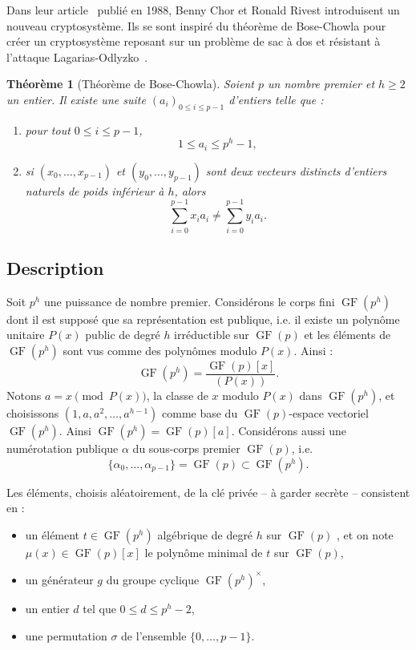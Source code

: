 \documentclass[a4paper, titlepage, 11pt]{article}
\newtheorem{theo}{Théorème}[section]
\theoremstyle{definition}
\theoremstyle{remark}
\def\gf{\operatorname{GF}}
\begin{document}
Dans leur article~\cite{chorRivest1988} publié en 1988, Benny Chor et Ronald Rivest introduisent un nouveau cryptosystème. Ils se sont inspiré du théorème de Bose-Chowla pour créer un cryptosystème reposant sur un problème de sac à dos et résistant à l'attaque Lagarias-Odlyzko~\cite{lagarias1983}.
\begin{theo}[Théorème de Bose-Chowla]
Soient $p$ un nombre premier et $h \geqslant 2$ un entier. Il existe une suite ${(a_i)}_{0\leqslant i \leqslant p-1}$ d'entiers telle que : \begin{enumerate}
\item pour tout $0 \leqslant i \leqslant p-1$, $$1 \leqslant a_i \leqslant p^h-1,$$
\item si $(x_0, \dots, x_{p-1})$ et $(y_0, \dots, y_{p-1})$ sont deux vecteurs distincts d'entiers naturels de poids inférieur à $h$, alors 
$$\sum_{i=0}^{p-1} x_ia_i \neq \sum_{i=0}^{p-1} y_ia_i.$$
\end{enumerate}
\end{theo}

\subsection{Description}

Soit $p^h$ une puissance de nombre premier. Considérons le corps fini $\gf(p^h)$ dont il est supposé que sa représentation est publique, i.e. il existe un polynôme unitaire $P(x)$ public de degré $h$ irréductible sur $\gf(p)$ et les éléments de $\gf(p^h)$ sont vus comme des polynômes modulo $P(x)$. Ainsi :
$$\gf(p^h) = \frac{\gf(p)[x]}{(P(x))}.$$
Notons $a = x \pmod{P(x)}$, la classe de $x$ modulo $P(x)$ dans $\gf(p^h)$, et choisissons $(1, a, a^2, \dots, a^{h-1})$ comme base du $\gf(p)$-espace vectoriel $\gf(p^h)$. Ainsi $\gf(p^h) = \gf(p)[a]$. Considérons aussi une numérotation publique $\alpha$ du sous-corps premier $\gf(p)$, i.e. $$\{\alpha_0,\dots, \alpha_{p-1}\} = \gf(p) \subset \gf(p^h).$$

Les éléments, choisis aléatoirement, de la clé privée -- à garder secrète -- consistent en :
\begin{itemize}
\item un élément $t \in \gf(p^h)$ algébrique de degré $h$ sur $\gf(p)$ , et on note $\mu(x) \in \gf(p)[x]$ le polynôme minimal de $t$ sur $\gf(p)$,
\item un générateur $g$ du groupe cyclique $\gf(p^h)^\times$,
\item un entier $d$ tel que $0 \leqslant d \leqslant p^h-2$,
\item une permutation $\sigma$ de l'ensemble $\{0, \dots, p-1\}$.
\end{itemize}
\end{document}
